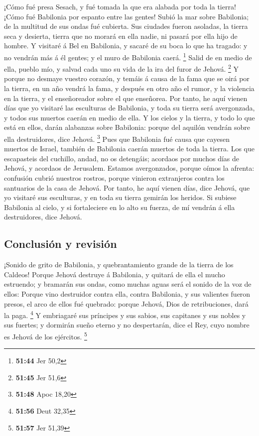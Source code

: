  ¡Cómo fué presa Sesach, y fué tomada la que era alabada
por toda la tierra! ¡Cómo fué Babilonia por espanto entre las gentes!
 Subió la mar sobre Babilonia; de la multitud de sus
ondas fué cubierta.  Sus ciudades fueron asoladas, la
tierra seca y desierta, tierra que no morará en ella nadie, ni pasará
por ella hijo de hombre.  Y visitaré á Bel en Babilonia,
y sacaré de su boca lo que ha tragado: y no vendrán más á él gentes; y
el muro de Babilonia caerá. \footnote{\textbf{51:44} Jer 50,2}
 Salid de en medio de ella, pueblo mío, y salvad cada uno
su vida de la ira del furor de Jehová. \footnote{\textbf{51:45} Jer 51,6}
 Y porque no desmaye vuestro corazón, y temáis á causa de
la fama que se oirá por la tierra, en un año vendrá la fama, y después
en otro año el rumor, y la violencia en la tierra, y el enseñoreador
sobre el que enseñorea.  Por tanto, he aquí vienen días
que yo visitaré las esculturas de Babilonia, y toda su tierra será
avergonzada, y todos sus muertos caerán en medio de ella.
 Y los cielos y la tierra, y todo lo que está en ellos,
darán alabanzas sobre Babilonia: porque del aquilón vendrán sobre ella
destruidores, dice Jehová. \footnote{\textbf{51:48} Apoc 18,20}
 Pues que Babilonia fué causa que cayesen muertos de
Israel, también de Babilonia caerán muertos de toda la tierra.
 Los que escapasteis del cuchillo, andad, no os
detengáis; acordaos por muchos días de Jehová, y acordaos de Jerusalem.
 Estamos avergonzados, porque oímos la afrenta: confusión
cubrió nuestros rostros, porque vinieron extranjeros contra los
santuarios de la casa de Jehová.  Por tanto, he aquí
vienen días, dice Jehová, que yo visitaré sus esculturas, y en toda su
tierra gemirán los heridos.  Si subiese Babilonia al
cielo, y si fortaleciere en lo alto su fuerza, de mí vendrán á ella
destruidores, dice Jehová.

\hypertarget{conclusiuxf3n-y-revisiuxf3n}{%
\subsection{Conclusión y revisión}\label{conclusiuxf3n-y-revisiuxf3n}}

 ¡Sonido de grito de Babilonia, y quebrantamiento grande
de la tierra de los Caldeos!  Porque Jehová destruye á
Babilonia, y quitará de ella el mucho estruendo; y bramarán sus ondas,
como muchas aguas será el sonido de la voz de ellos: 
Porque vino destruidor contra ella, contra Babilonia, y sus valientes
fueron presos, el arco de ellos fué quebrado: porque Jehová, Dios de
retribuciones, dará la paga. \footnote{\textbf{51:56} Deut 32,35}
 Y embriagaré sus príncipes y sus sabios, sus capitanes y
sus nobles y sus fuertes; y dormirán sueño eterno y no despertarán, dice
el Rey, cuyo nombre es Jehová de los ejércitos. \footnote{\textbf{51:57}
  Jer 51,39}


